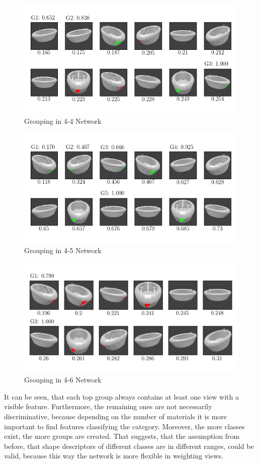 \begin{figure}
	\centering
	\includegraphics[trim=10 20 10 20, clip]{images/mn-sl-4-4-20/bathtub_0107_3_grouping.png}
	\caption{Grouping in 4-4 Network}
	\label{fig:grouping-4-4}
\end{figure}
\begin{figure}
	\centering
	\includegraphics[trim=10 20 10 20, clip]{images/mn-sl-4-5-20/bathtub_0107_4_grouping.png}
	\caption{Grouping in 4-5 Network}
	\label{fig:grouping-4-5}
\end{figure}
\begin{figure}
	\centering
	\includegraphics[draft, trim=10 20 10 20, clip]{images/mn-sl-4-6-20/bathtub_0107_5_grouping.png}
	\caption{Grouping in 4-6 Network}
	\label{fig:grouping-4-6}
\end{figure}
It can be seen, that each top group always contains at least one view with a visible feature.
Furthermore, the remaining ones are not necessarily discriminative, because depending on the number of materials it is more important to find features classifying the category.
Moreover, the more classes exist, the more groups are created.
That suggests, that the assumption from before, that shape descriptors of different classes are in different ranges, could be valid, because this way the network is more flexible in weighting views.